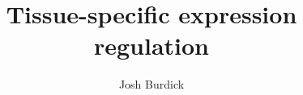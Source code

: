 \documentclass{article}
\begin{document}
\title{Tissue-specific expression regulation}
\author{Josh Burdick}
\maketitle


\end{document}

